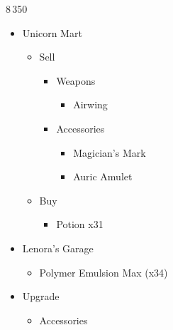 \begin{paracol}{2}
	\renewcommand{\first}{[1] Slash \& Burn (\com/\rav)}
	\renewcommand{\second}{[2] Tide Turner (\syn/\sab)}
	\renewcommand{\third}{[3] Divide \& Conquer (\com/\sab)}
	\renewcommand{\fourth}{[4] Dualcasting (\rav/\rav)}
	\renewcommand{\fifth}{[5] Undermine (\rav/\sab)}
	\renewcommand{\sixth}{[6] Slash \& Burn (\com/\rav)}

	\begin{shop}{8\,350}
		\begin{itemize}
			\item Unicorn Mart
			      \begin{itemize}
				      \item Sell
				            \begin{itemize}
					            \item Weapons
					                  \begin{itemize}
						                  \item Airwing
					                  \end{itemize}
					            \item Accessories
					                  \begin{itemize}
						                  \item Magician's Mark
						                  \item Auric Amulet
					                  \end{itemize}
				            \end{itemize}
				      \item Buy
				            \begin{itemize}
					            \item Potion x31
				            \end{itemize}
			      \end{itemize}
			\item Lenora's Garage
			      \begin{itemize}
				      \item Polymer Emulsion Max (x34)
			      \end{itemize}
		\end{itemize}
	\end{shop}
	\begin{upgrade}
		\begin{itemize}
			\item Upgrade
			      \begin{itemize}
				      \item Accessories
				            \begin{itemize}

\end{itemize}
\end{itemize}
\end{itemize}
\end{upgrade}
\end{paracol}
